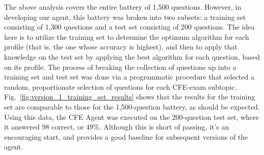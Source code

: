  
\begin{table}[h!]
\centering
\small
{}
\caption{Hypothesis Test for Multiple-Choice Questions}
\label{table:hypothesis_test_for_multiple_choice_questions}
\end{table}


The above analysis covers the entire battery of 1,500 questions.  However, in developing our agent, this battery was broken into two subsets:  a training set consisting of 1,300 questions and a test set consisting of 200 questions.  The idea here is to utilize the training set to determine the optimum algorithm for each profile (that is, the one whose accuracy is highest), and then to apply that knowledge on the test set by applying the best algorithm for each question, based on its profile.  The process of breaking the collection of questions up into a training set and test set was done via a programmatic procedure that selected a random, proportionate selection of questions for each CFE-exam subtopic.  Fig.~\ref{fig:version_1_training_set_results} shows that the results for the training set are comparable to those for the 1,500-question battery, as should be expected.  Using this data, the CFE Agent was executed on the 200-question test set, where it answered 98 correct, or 49\%.  Although this is short of passing, it's an encouraging start, and provides a good baseline for subsequent versions of the agent.

